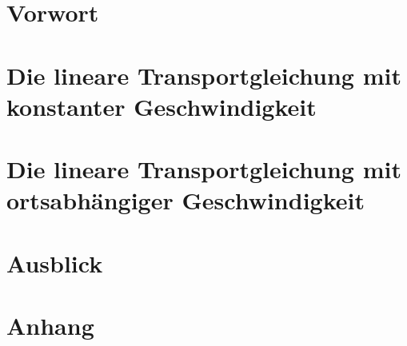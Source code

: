 \documentclass[a4paper
               ,12pt%
               ,10BCOM%
               ,openright%
               ,titlepage%
               ,twoside%
               ]{scrreprt}
\numberwithin{equation}{section}
\begin{document}

\pagestyle{empty}
\clearpage{}



\tableofcontents

\clearpage{}
\pagestyle{plain}
\setcounter{page}{1}

\chapter{Vorwort}

% 
\chapter{Die lineare Transportgleichung mit konstanter Geschwindigkeit}

\chapter{Die lineare Transportgleichung mit ortsabhängiger Geschwindigkeit}

\chapter{Ausblick}

% 



\appendix

\chapter{Anhang}


\end{document}
